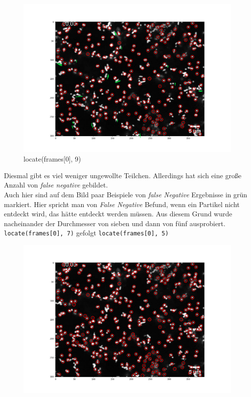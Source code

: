 \begin{enumerate}
\begin{figure}[H]
    \centering
    \includegraphics[scale=0.35]{Grafiken/trackpyBilder/locate(frames[0], 9).png}
    \caption{locate(frames[0], 9)}
    \label{fig:bild_label}
\end{figure} 

Diesmal gibt es viel weniger ungewollte Teilchen. Allerdings hat sich eine große Anzahl von \textit{\gls{false negative}} gebildet. \\ 
Auch hier sind auf dem Bild paar Beispiele von  \textit{false Negative} Ergebnisse in grün markiert.
Hier spricht man von \textit{False Negative} Befund, wenn ein Partikel nicht entdeckt wird, das hätte entdeckt werden müssen.
Aus diesem Grund wurde nacheinander der Durchmesser von sieben und dann von fünf ausprobiert.\\
\texttt{locate(frames[0], 7)}   gefolgt  \texttt{locate(frames[0], 5)}
\newpage

\begin{figure}[H]
    \centering
    \begin{minipage}{.5\textwidth}
     	\centering
  	  	\includegraphics[scale=0.3]{Grafiken/trackpyBilder/locate(frames[0], 7).png}
 		\label{fig:test1}
    \end{minipage}
	

\end{figure}
\end{enumerate}
